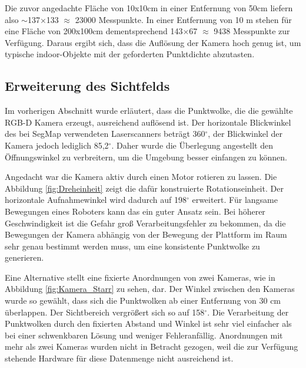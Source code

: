 Die zuvor angedachte Fläche von 10x10cm in einer Entfernung von 50cm liefern also $\sim$137$\times$133 $\approx$ 23000 Messpunkte. In einer Entfernung von 10 m stehen für eine Fläche von 200x100cm dementsprechend 143$\times$67 $\approx$ 9438 Messpunkte zur Verfügung. Daraus ergibt sich, dass die Auflösung der Kamera hoch genug ist, um typische indoor-Objekte mit der geforderten Punktdichte abzutasten. 


\subsection[Erweiterung des Sichtfelds (Kopp)]{Erweiterung des Sichtfelds} 
\label{sec:stereo}
 
Im vorherigen Abschnitt wurde erläutert, dass die Punktwolke, die die gewählte RGB-D Kamera erzeugt, ausreichend auflösend ist. Der horizontale Blickwinkel des bei SegMap verwendeten Laserscanners beträgt 360$^\circ$, der Blickwinkel der Kamera jedoch lediglich 85,2$^\circ$. Daher wurde die Überlegung angestellt den Öffnungswinkel zu verbreitern, um die Umgebung besser einfangen zu können. 

Angedacht war die Kamera aktiv durch einen Motor rotieren zu lassen. Die Abbildung \ref{fig:Dreheinheit} zeigt die dafür konstruierte Rotationseinheit. Der horizontale Aufnahmewinkel wird dadurch auf 198$^\circ$ erweitert. Für langsame Bewegungen eines Roboters kann das ein guter Ansatz sein. Bei höherer Geschwindigkeit ist die Gefahr groß Verarbeitungsfehler zu bekommen, da die Bewegungen der Kamera abhängig von der Bewegung der Plattform im Raum sehr genau bestimmt werden muss, um eine konsistente Punktwolke zu generieren.

Eine Alternative stellt eine fixierte Anordnungen von zwei Kameras, wie in Abbildung \ref{fig:Kamera_Starr} zu sehen, dar. Der Winkel zwischen den Kameras wurde so gewählt, dass sich die Punktwolken ab einer Entfernung von 30 cm überlappen. Der Sichtbereich vergrößert sich so auf 158$^\circ$. Die Verarbeitung der Punktwolken durch den fixierten Abstand und Winkel ist sehr viel einfacher als bei einer schwenkbaren Lösung und weniger Fehleranfällig. Anordnungen mit mehr als zwei Kameras wurden nicht in Betracht gezogen, weil die zur Verfügung stehende Hardware für diese Datenmenge nicht ausreichend ist. 

